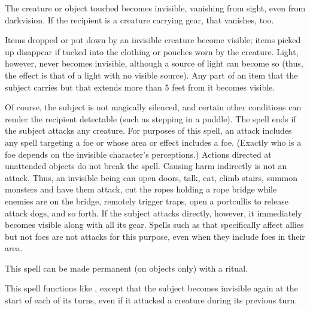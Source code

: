 \spellrng{\rngclose}
\begin{spelleffect}
  The creature or object touched becomes invisible, vanishing from sight, even from darkvision. If the recipient is a creature carrying gear, that vanishes, too.
  \par Items dropped or put down by an invisible creature become visible; items picked up disappear if tucked into the clothing or pouches worn by the creature. Light, however, never becomes invisible, although a source of light can become so (thus, the effect is that of a light with no visible source). Any part of an item that the subject carries but that extends more than 5 feet from it becomes visible.
  \par Of course, the subject is not magically silenced, and certain other conditions can render the recipient detectable (such as stepping in a puddle). The spell ends if the subject attacks any creature. For purposes of this spell, an attack includes any spell targeting a foe or whose area or effect includes a foe. (Exactly who is a foe depends on the invisible character's perceptions.) Actions directed at unattended objects do not break the spell. Causing harm indirectly is not an attack. Thus, an invisible being can open doors, talk, eat, climb stairs, summon monsters and have them attack, cut the ropes holding a rope bridge while enemies are on the bridge, remotely trigger traps, open a portcullis to release attack dogs, and so forth. If the subject attacks directly, however, it immediately becomes visible along with all its gear. Spells such as  that specifically affect allies but not foes are not attacks for this purpose, even when they include foes in their area.
\end{spelleffect}
\begin{spellnotes}
This spell can be made permanent (on objects only) with a  ritual.
\end{spellnotes}

\begin{spelleffect}
  This spell functions like , except that the subject becomes invisible again at the start of each of its turns, even if it attacked a creature during its previous turn.
\end{spelleffect}

